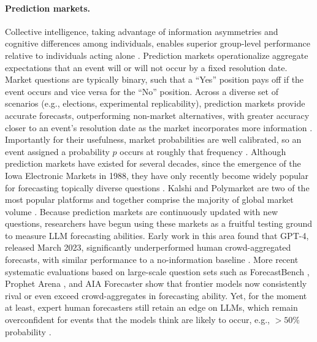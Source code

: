 \documentclass[11pt]{article}
\begin{document}
\paragraph{Prediction markets.} Collective intelligence, taking advantage of information asymmetries and cognitive differences among individuals, enables superior group-level performance relative to individuals acting alone \citep{woolley2010collective, riedl2021collective}. Prediction markets operationalize aggregate expectations that an event will or will not occur by a fixed resolution date. Market questions are typically binary, such that a ``Yes'' position pays off if the event occurs and vice versa for the ``No'' position. Across a diverse set of scenarios (e.g., elections, experimental replicability), prediction markets provide accurate forecasts, outperforming non-market alternatives, with greater accuracy closer to an event's resolution date as the market incorporates more information \citep{wolfers2004prediction, arrow2008promise, wolfers2006theory}. Importantly for their usefulness, market probabilities are well calibrated, so an event assigned a probability $p$ occurs at roughly that frequency \citep{dickerson2026knowability, reichenbach2025polymarket}. Although prediction markets have existed for several decades, since the emergence of the Iowa Electronic Markets \citep{gomme2003iowa} in 1988, they have only recently become widely popular for forecasting topically diverse questions \citep{mann2016prediction}. Kalshi and Polymarket are two of the most popular platforms and together comprise the majority of global market volume \citep{diercks2026kalshi}. Because prediction markets are continuously updated with new questions, researchers have begun using these markets as a fruitful testing ground to measure LLM forecasting abilities. Early work in this area found that GPT-4, released March 2023, significantly underperformed human crowd-aggregated forecasts, with similar performance to a no-information baseline \citep{schoenegger2023llm}. More recent systematic evaluations based on large-scale question sets such as ForecastBench \citep{zou2024forecastbench}, Prophet Arena \citep{yang2025prophet}, and AIA Forecaster \citep{aia2025forecaster} show that frontier models now consistently rival or even exceed crowd-aggregates in forecasting ability. Yet, for the moment at least, expert human forecasters still retain an edge on LLMs, which remain overconfident for events that the models think are likely to occur, e.g., $> 50\%$ probability \citep{lu2025expert}.
\end{document}

